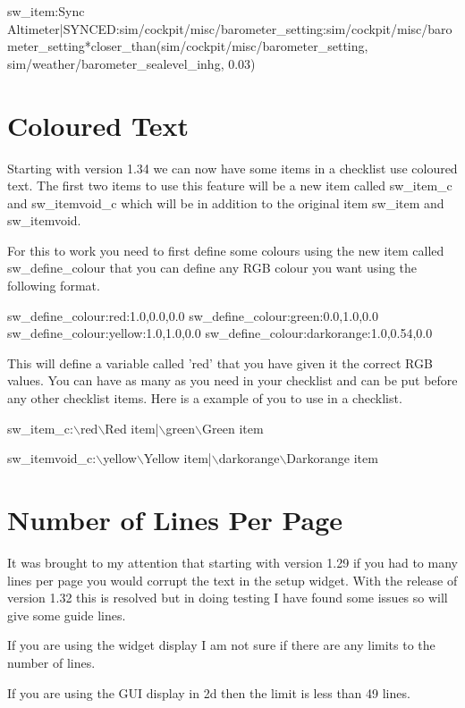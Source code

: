 \documentclass[11pt,parskip=half,a4paper]{scrartcl}
\begin{document}
sw\_item:Sync Altimeter|SYNCED:sim/cockpit/misc/barometer\_setting:{sim/cockpit/misc/barometer\_setting}*closer\_than({sim/cockpit/misc/barometer\_setting}, {sim/weather/barometer\_sealevel\_inhg}, 0.03)


\newpage
\section{Coloured Text}

Starting with version 1.34 we can now have some items in a checklist use coloured text. The first two items to use this feature will be a new item called sw\_item\_c and sw\_itemvoid\_c which will be in addition to the original item sw\_item and sw\_itemvoid.

For this to work you need to first define some colours using the new item called sw\_define\_colour that you can define any RGB colour you want using the following format.

sw\_define\_colour:red:1.0,0.0,0.0 \newline
sw\_define\_colour:green:0.0,1.0,0.0 \newline
sw\_define\_colour:yellow:1.0,1.0,0.0 \newline
sw\_define\_colour:darkorange:1.0,0.54,0.0

This will define a variable called 'red' that you have given it the correct RGB values. You can have as many as you need in your checklist and can be put before any other checklist items. Here is a example of you to use in a checklist.

sw\_item\_c:$\backslash$red$\backslash$Red item|$\backslash$green$\backslash$Green item

sw\_itemvoid\_c:$\backslash$yellow$\backslash$Yellow item|$\backslash$darkorange$\backslash$Darkorange item


\newpage
\section{Number of Lines Per Page}


It was brought to my attention that starting with version 1.29 if you had to many lines per page you would corrupt the text in the setup widget. With the release of version 1.32 this is resolved but in doing testing I have found some issues so will give some guide lines.

If you are using the widget display I am not sure if there are any limits to the number of lines.

If you are using the GUI display in 2d then the limit is less than 49 lines.
\end{document}
